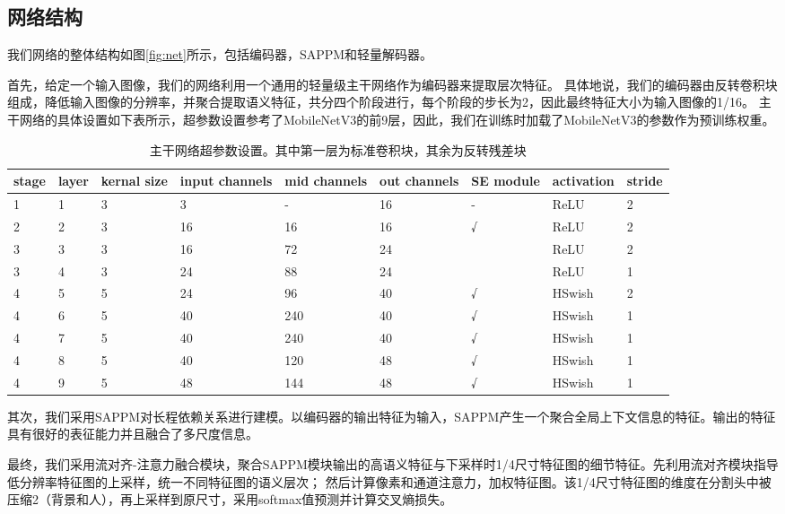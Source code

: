 \documentclass[11pt]{article}
\begin{document}
\subsection{网络结构}
我们网络的整体结构如图\ref{fig:net}所示，包括编码器，SAPPM和轻量解码器。


首先，给定一个输入图像，我们的网络利用一个通用的轻量级主干网络作为编码器来提取层次特征。
具体地说，我们的编码器由反转卷积块组成，降低输入图像的分辨率，并聚合提取语义特征，共分四个阶段进行，每个阶段的步长为2，因此最终特征大小为输入图像的1/16。
主干网络的具体设置如下表所示，超参数设置参考了MobileNetV3的前9层，因此，我们在训练时加载了MobileNetV3的参数作为预训练权重。

\begin{table}[!ht]
  \centering
  \begin{tabular}{|l|l|l|l|l|l|l|l|l|}
  \hline
      stage & layer & kernal size & input channels & mid channels & out channels & SE module & activation & stride \\ \hline
      1 & 1 & 3 & 3 & - & 16 & - & ReLU & 2 \\ \hline
      2 & 2 & 3 & 16 & 16 & 16 & √ & ReLU & 2 \\ \hline
      3 & 3 & 3 & 16 & 72 & 24 & ~ & ReLU & 2 \\ \hline
      3 & 4 & 3 & 24 & 88 & 24 & ~ & ReLU & 1 \\ \hline
      4 & 5 & 5 & 24 & 96 & 40 & √ & HSwish & 2 \\ \hline
      4 & 6 & 5 & 40 & 240 & 40 & √ & HSwish & 1 \\ \hline
      4 & 7 & 5 & 40 & 240 & 40 & √ & HSwish & 1 \\ \hline
      4 & 8 & 5 & 40 & 120 & 48 & √ & HSwish & 1 \\ \hline
      4 & 9 & 5 & 48 & 144 & 48 & √ & HSwish & 1 \\ \hline
  \end{tabular}
  \caption{主干网络超参数设置。其中第一层为标准卷积块，其余为反转残差块}
\label{table:1}
\end{table}
其次，我们采用SAPPM对长程依赖关系进行建模。以编码器的输出特征为输入，SAPPM产生一个聚合全局上下文信息的特征。输出的特征具有很好的表征能力并且融合了多尺度信息。

最终，我们采用流对齐-注意力融合模块，聚合SAPPM模块输出的高语义特征与下采样时1/4尺寸特征图的细节特征。先利用流对齐模块指导低分辨率特征图的上采样，统一不同特征图的语义层次；
然后计算像素和通道注意力，加权特征图。该1/4尺寸特征图的维度在分割头中被压缩2（背景和人），再上采样到原尺寸，采用softmax值预测并计算交叉熵损失。
\end{document}
